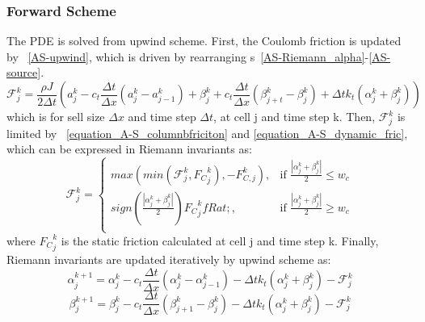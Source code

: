 \subsubsection{Forward Scheme}
The PDE is solved from upwind scheme. First, the Coulomb friction is updated by \equationname~\ref{AS-upwind}, which is driven by rearranging \equationname{}s~\ref{AS-Riemann_alpha}-\ref{AS-source}.
\begin{equation}\label{AS-upwind}
  \mathcal{F}_{j}^k = \frac{\rho J}{2 \Delta t}\left(a_j^k - c_t \frac{\Delta t}{\Delta x}(a_j^k - a_{j-1}^k) + \beta_j^k + c_t \frac{\Delta t}{\Delta x}(\beta_{j+t}^k-\beta_j^k) + \Delta t k_t (\alpha_j^k + \beta_j^k)\right)
\end{equation}
which is for sell size $\Delta x$ and time step $\Delta t$, at cell j and time step k.
Then, $\mathcal{F}_{j}^k$ is limited by \equationname~\ref{equation_A-S_columnbfriciton} and \ref{equation_A-S_dynamic_fric}, which can be expressed in Riemann invariants as:
\begin{equation}\label{equation_A-S_columnbfriciton_Riemann}
\mathcal{F}_{j}^k =
  \begin{cases}
      max(min(\mathcal{F}_{j}^k,{F_C}_j^k),-F_{C,j}^k) , & \mbox{if } \frac{|\alpha_j^k + \beta_j^k|}{2} \le w_c \\
      sign(\frac{|\alpha_j^k + \beta_j^k|}{2}){F_C}_j^k fRat; , & \mbox{if } \frac{|\alpha_j^k + \beta_j^k|}{2} \ge w_c \\
  \end{cases}
\end{equation}
where ${F_C}_j^k$ is the static friction calculated at cell j and time step k. Finally, Riemann invariants are updated iteratively by upwind scheme as:
\begin{equation}\label{equation_upwind_alpha}
  \alpha_j^{k+1} = \alpha_j^{k} - c_t \frac{\Delta t}{\Delta x}(\alpha_j^k - \alpha_{j-1}^k) - \Delta t k_t (\alpha_j^k + \beta_j^k) - \mathcal{F}_j^k
\end{equation}
\begin{equation}\label{equation_upwind_beta}
  \beta_j^{k+1} = \beta_j^{k} - c_t \frac{\Delta t}{\Delta x}(\beta_{j+1}^k - \beta_{j}^k) - \Delta t k_t (\alpha_j^k + \beta_j^k) - \mathcal{F}_j^k
\end{equation}
